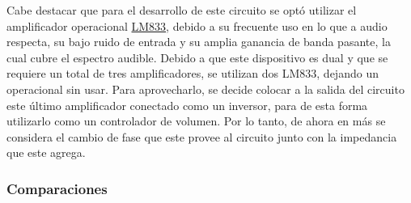 Cabe destacar que para el desarrollo de este circuito se optó utilizar el amplificador operacional \href{http://www.ti.com/lit/ds/symlink/lm833-n.pdf}{LM833}, debido a su frecuente uso en lo que a audio respecta, su bajo ruido de entrada y su amplia ganancia de banda pasante, la cual cubre el espectro audible. Debido a que este dispositivo es dual y que se requiere un total de tres amplificadores, se utilizan dos LM833, dejando un operacional sin usar. Para aprovecharlo, se decide colocar a la salida del circuito este último amplificador conectado como un inversor, para de esta forma utilizarlo como un controlador de volumen. Por lo tanto, de ahora en más se considera el cambio de fase que este provee al circuito junto con la impedancia que este agrega.   

\subsubsection{Comparaciones}


